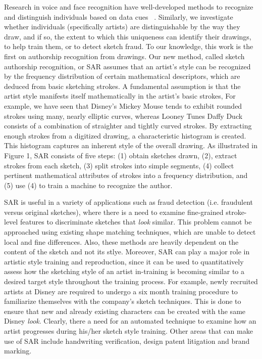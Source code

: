 Research in voice and face recognition have well-developed methods to recognize and distinguish individuals based on data cues ~\cite{tolba2006face}. Similarly, we investigate whether individuals (specifically artists) are distinguishable by the way they draw, and if so, the extent to which this uniqueness can identify their drawings, to help train them, or to detect sketch fraud. To our knowledge, this work is the first on authorship recognition from drawings. Our new method, called sketch authorship recognition, or SAR assumes that an artist's style can be recognized by the frequency distribution of certain mathematical descriptors, which are deduced from basic sketching strokes. A fundamental assumption is that the artist style manifests itself mathematically in the artist's basic strokes, For example, we have seen that Disney's Mickey Mouse tends to exhibit rounded strokes using many, nearly elliptic curves, whereas Looney Tunes Daffy Duck consists of a combination of straighter and tightly curved strokes. By extracting enough strokes from a digitized drawing, a characteristic histogram is created. This histogram captures an inherent style of the overall drawing.  As illustrated in Figure 1, SAR consists of five steps: (1) obtain sketches drawn, (2), extract strokes from each sketch, (3) split strokes into simple segments, (4) collect pertinent mathematical attributes of strokes into a frequency distribution, and (5) use (4) to train a machine to recognize the author.

\vspace{-1mm}
SAR is useful in a variety of applications such as fraud detection (i.e. fraudulent versus original sketches), where there is a need to examine fine-grained stroke-level features to discriminate sketches that \emph{look} similar. This problem cannot be approached using existing shape matching techniques, which are unable to detect local and fine differences. Also, these methods are heavily dependent on the content of the sketch and not its stlye. Moreover, SAR can play a major role in artistic style training and reproduction, since it can be used to quantitatively assess how the sketching style of an artist in-training is becoming similar to a desired target style throughout the training process. For example, newly recruited artists at Disney
are required to undergo a six month training procedure to familiarize themselves with the company's sketch techniques. This is done to ensure that new and already existing characters can be created with the same Disney \emph{look}. Clearly, there a need for an automated technique to examine how an artist progresses during his/her sketch style training. Other areas that can make use of SAR include handwriting verification, design patent litigation and brand marking.

